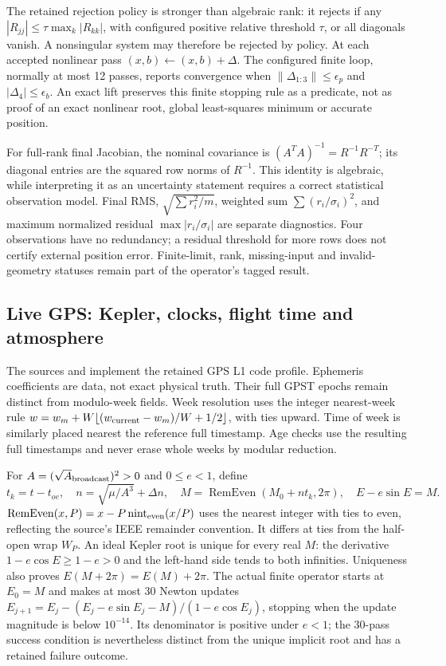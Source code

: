 The retained rejection policy is stronger than algebraic rank: it rejects if
any $|R_{jj}|\le\tau\max_k|R_{kk}|$, with configured positive relative threshold
$\tau$, or all diagonals vanish. A nonsingular system may therefore be rejected
by policy. At each accepted nonlinear pass $(x,b)\leftarrow(x,b)+\Delta$.
The configured finite loop, normally at most 12 passes, reports convergence
when $\|\Delta_{1:3}\|\le\epsilon_p$ and $|\Delta_4|\le\epsilon_b$.
An exact lift preserves this finite stopping rule as a predicate, not as proof
of an exact nonlinear root, global least-squares minimum or accurate position.

For full-rank final Jacobian, the nominal covariance is
$(A^TA)^{-1}=R^{-1}R^{-T}$; its diagonal entries are the squared row norms of
$R^{-1}$. This identity is algebraic, while interpreting it as an uncertainty
statement requires a correct statistical observation model. Final RMS,
$\sqrt{\sum r_i^2/m}$, weighted sum $\sum(r_i/\sigma_i)^2$, and maximum normalized
residual $\max|r_i/\sigma_i|$ are separate diagnostics. Four observations have no
redundancy; a residual threshold for more rows does not certify external
position error. Finite-limit, rank, missing-input and invalid-geometry statuses
remain part of the operator's tagged result.

\subsection{Live GPS: Kepler, clocks, flight time and atmosphere}
\label{sec:lift-live}
The sources  and  implement the
retained GPS L1 code profile. Ephemeris coefficients are data, not exact physical
truth. Their full GPST epochs remain distinct from modulo-week fields.
Week resolution uses the integer nearest-week rule
$w=w_m+W\lfloor(w_{\rm current}-w_m)/W+1/2\rfloor$, with ties upward. Time of
week is similarly placed nearest the reference full timestamp. Age checks use
the resulting full timestamps and never erase whole weeks by modular reduction.

For $A=(\sqrt A_{\rm broadcast})^2>0$ and $0\le e<1$, define
\begin{equation}
 t_k=t-t_{oe},\quad n=\sqrt{\mu/A^3}+\Delta n,\quad
 M=\operatorname{RemEven}(M_0+nt_k,2\pi),\quad
 E-e\sin E=M.
\end{equation}
$\operatorname{RemEven}(x,P)=x-P\operatorname{nint}_{\rm even}(x/P)$ uses the
nearest integer with ties to even, reflecting the source's IEEE remainder
convention. It differs at ties from the half-open wrap $W_P$. An ideal Kepler
root is unique for every real $M$: the derivative $1-e\cos E\ge1-e>0$ and the
left-hand side tends to both infinities. Uniqueness also proves
$E(M+2\pi)=E(M)+2\pi$. The actual finite operator starts at $E_0=M$ and makes
at most 30 Newton updates
$E_{j+1}=E_j-(E_j-e\sin E_j-M)/(1-e\cos E_j)$, stopping when the update
magnitude is below $10^{-14}$. Its denominator is positive under $e<1$;
the 30-pass success condition is nevertheless distinct from the unique
implicit root and has a retained failure outcome.

